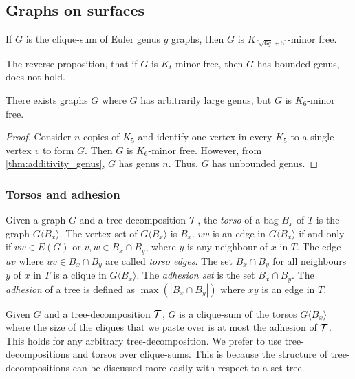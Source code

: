 \subsection{Graphs on surfaces}
\begin{corollary}\label{corr:clique_sum_genus}
	If \(G\) is the clique-sum of Euler genus \(g\) graphs, then \(G\) is \(K_{\lceil \sqrt{6g} + 5 \rceil}\)-minor free.
\end{corollary}
The reverse proposition, that if $G$ is $K_t$-minor free, then $G$ has bounded genus, does not hold.
\begin{proposition}
	There exists graphs $G$ where \(G\) has arbitrarily large genus, but $G$ is \(K_{6}\)-minor free.
\end{proposition}

\begin{proof}
	Consider $n$ copies of $K_5$ and identify one vertex in every $K_5$ to a single vertex $v$ to form $G$. Then $G$ is $K_6$-minor free. However, from \cref{thm:additivity_genus}, $G$ has genus $n$. Thus, $G$ has unbounded genus. 
\end{proof}

\subsubsection{Torsos and adhesion}\label{sssec:Torsos and Adhesion}
Given a graph \(G\) and a tree-decomposition \(\mathcal{T}\), the \textit{torso} of a bag \(B_x\) of \(T\) is the graph \(G\langle B_x \rangle\). The vertex set of \(G\langle B_x \rangle\) is $B_x$. \(vw\) is an edge in \(G\langle B_x \rangle\) if and only if $vw \in E(G)$ or \(v,w \in B_x \cap B_y\), where \(y\) is any neighbour of \(x\) in \(T\). The edge $uv$ where $uv \in B_x \cap B_y$ are called \textit{torso edges}. The set \(B_x \cap B_y\) for all neighbours \(y\) of \(x\) in \(T\) is a clique in \(G\langle B_x \rangle\).
The \textit{adhesion set} is the set \(B_x \cap B_y\). 
The \textit{adhesion} of a tree is defined as \(\max(|B_x \cap B_y|)\) where \(xy\) is an edge in \(T\).

Given \(G\) and a tree-decomposition \(\mathcal{T}\), \(G\) is a clique-sum of the torsos \(G\langle B_x \rangle\) where the size of the cliques that we paste over is at most the adhesion of $\mathcal{T}$. This holds for any arbitrary tree-decomposition.
We prefer to use tree-decompositions and torsos over clique-sums. This is because the structure of tree-decompositions can be discussed more easily with respect to a set tree.


